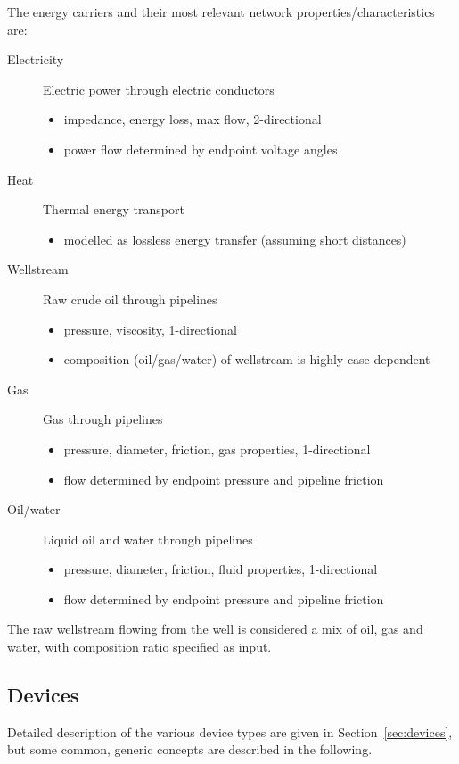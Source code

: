\documentclass[12pt]{article}
\begin{document}
The energy carriers and their most relevant network properties/characteristics are:
\begin{description}
	\item[Electricity] Electric power through electric conductors
	\begin{itemize}
		\item impedance, energy loss, max flow, 2-directional
		\item power flow determined by endpoint voltage angles
	\end{itemize}
	\item[Heat] Thermal energy transport
	\begin{itemize}
		\item modelled as lossless energy transfer (assuming short distances)
	\end{itemize}
	\item[Wellstream] Raw crude oil through pipelines
	\begin{itemize}
		\item pressure, viscosity, 1-directional
		\item composition (oil/gas/water) of wellstream is highly case-dependent
	\end{itemize}
	\item[Gas] Gas through pipelines
	\begin{itemize}
		\item pressure, diameter, friction, gas properties, 1-directional
		\item flow determined by endpoint pressure and pipeline friction
	\end{itemize}
	\item[Oil/water] Liquid oil and water through pipelines
	\begin{itemize}
		\item pressure, diameter, friction, fluid properties, 1-directional
		\item flow determined by endpoint pressure and pipeline friction
	\end{itemize}
\end{description}
The raw wellstream flowing from the well is considered a mix of oil, gas and water, with composition ratio specified as input.



\subsection{Devices}

Detailed description of the various device types are given in Section~\ref{sec:devices}, but some common, generic concepts are described in the following.
\end{document}
